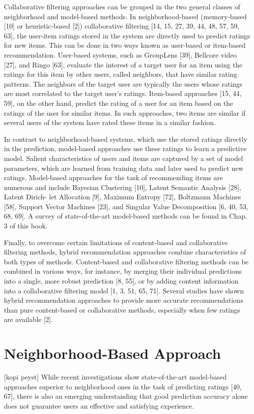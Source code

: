 Collaborative filtering approaches can be grouped in the two general classes of neighborhood and model-based methods. In neighborhood-based (memory-based [10] or heuristic-based [2]) collaborative filtering [14, 15, 27, 39, 44, 48, 57, 59, 63], the user-item ratings stored in the system are directly used to predict ratings for new items. This can be done in two ways known as user-based or item-based recommendation. User-based systems, such as GroupLens [39], Bellcore video [27], and Ringo [63], evaluate the interest of a target user for an item using the ratings for this item by other users, called neighbors, that have similar rating patterns. The neighbors of the target user are typically the users whose ratings are most correlated to the target user’s ratings. Item-based approaches [15, 44, 59], on the other hand, predict the rating of a user for an item based on the ratings of the user for similar items. In such approaches, two items are similar if several users of the system have rated these items in a similar fashion.

In contrast to neighborhood-based systems, which use the stored ratings directly in the prediction, model-based approaches use these ratings to learn a predictive model. Salient characteristics of users and items are captured by a set of model parameters, which are learned from training data and later used to predict new ratings. Model-based approaches for the task of recommending items are numerous and include Bayesian Clustering [10], Latent Semantic Analysis [28], Latent Dirich- let Allocation [9], Maximum Entropy [72], Boltzmann Machines [58], Support Vector Machines [23], and Singular Value Decomposition [6, 40, 53, 68, 69]. A survey of state-of-the-art model-based methods can be found in Chap. 3 of this book.

Finally, to overcome certain limitations of content-based and collaborative filtering methods, hybrid recommendation approaches combine characteristics of both types of methods. Content-based and collaborative filtering methods can be combined in various ways, for instance, by merging their individual predictions into a single, more robust prediction [8, 55], or by adding content information into a collaborative filtering model [1, 3, 51, 65, 71]. Several studies have shown hybrid recommendation approaches to provide more accurate recommendations than pure content-based or collaborative methods, especially when few ratings are available [2].

\section{Neighborhood-Based Approach}
[kopi peyst]
While recent investigations show state-of-the-art model-based approaches superior to neighborhood ones in the task of predicting ratings [40, 67], there is also an emerging understanding that good prediction accuracy alone does not guarantee users an effective and satisfying experience.

